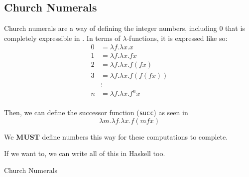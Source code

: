 \subsection{Church Numerals}\label{subsec:Church_Numerals}
Church numerals are a way of defining the integer numbers, including 0 that is completely expressible in .
In terms of $\lambda$-functions, it is expressed like so:
\begin{equation}\label{eq:Church_Numerals}
  \begin{aligned}
    0 &= \lambda f.\lambda x.x \\
    1 &= \lambda f.\lambda x. fx \\
    2 &= \lambda f.\lambda x. f(f x) \\
    3 &= \lambda f.\lambda x. f(f (f x)) \\
    &\vdots \\
    n &= \lambda f. \lambda x. f^{n} x \\
  \end{aligned}
\end{equation}

Then, we can define the successor function (\texttt{succ}) as seen in 
\begin{equation}\label{eq:Church_Numerals_Succ}
  \lambda m. \lambda f. \lambda x. f (m f x)
\end{equation}

We \textbf{MUST} define numbers this way for these computations to complete.

If we want to, we can write all of this in Haskell too.

\begin{listing}[h!tbp]
\caption{Church Numerals}
\label{lst:Church_Numerals}
\end{listing}

